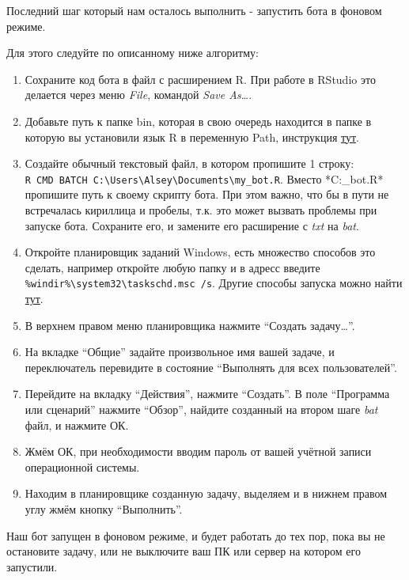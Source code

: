\documentclass[
]{book}
\providecommand{\tightlist}{%
  \setlength{\itemsep}{0pt}\setlength{\parskip}{0pt}}
\begin{document}
Последний шаг который нам осталось выполнить - запустить бота в фоновом режиме.

Для этого следуйте по описанному ниже алгоритму:

\begin{enumerate}
\def\labelenumi{\arabic{enumi}.}
\tightlist
\item
  Сохраните код бота в файл с расширением R. При работе в RStudio это делается через меню \emph{File}, командой \emph{Save As\ldots{}}.
\item
  Добавьте путь к папке bin, которая в свою очередь находится в папке в которую вы установили язык R в переменную Path, инструкция \href{https://www.java.com/ru/download/help/path.xml}{тут}.
\item
  Создайте обычный текстовый файл, в котором пропишите 1 строку: \texttt{R\ CMD\ BATCH\ C:\textbackslash{}Users\textbackslash{}Alsey\textbackslash{}Documents\textbackslash{}my\_bot.R}. Вместо *C:\Users\Alsey\Documents\my\_bot.R* пропишите путь к своему скрипту бота. При этом важно, что бы в пути не встречалась кириллица и пробелы, т.к. это может вызвать проблемы при запуске бота. Сохраните его, и замените его расширение с \emph{txt} на \emph{bat}.
\item
  Откройте планировщик заданий Windows, есть множество способов это сделать, например откройте любую папку и в адресс введите \texttt{\%windir\%\textbackslash{}system32\textbackslash{}taskschd.msc\ /s}. Другие способы запуска можно найти \href{https://remontka.pro/open-task-scheduler-windows/}{тут}.
\item
  В верхнем правом меню планировщика нажмите ``Создать задачу\ldots{}''.
\item
  На вкладке ``Общие'' задайте произвольное имя вашей задаче, и переключатель перевидите в состояние ``Выполнять для всех пользователей''.
\item
  Перейдите на вкладку ``Действия'', нажмите ``Создать''. В поле ``Программа или сценарий'' нажмите ``Обзор'', найдите созданный на втором шаге \emph{bat} файл, и нажмите ОК.
\item
  Жмём ОК, при необходимости вводим пароль от вашей учётной записи операционной системы.
\item
  Находим в планировщике созданную задачу, выделяем и в нижнем правом углу жмём кнопку ``Выполнить''.
\end{enumerate}

Наш бот запущен в фоновом режиме, и будет работать до тех пор, пока вы не остановите задачу, или не выключите ваш ПК или сервер на котором его запустили.
\end{document}
